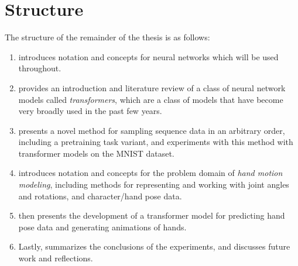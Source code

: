 \section{Structure}

The structure of the remainder of the thesis is as follows:

\begin{enumerate}
    \item {}  introduces notation and concepts for neural networks which will be used throughout.

    \item {} provides an introduction and literature review of a class of neural network models called \textit{transformers}, which are a class of models that have become very broadly used in the past few years.

    \item {} presents a novel method for sampling sequence data in an arbitrary order, including a pretraining task variant, and experiments with this method with transformer models on the MNIST dataset.

    \item {} introduces notation and concepts for the problem domain of \textit{hand motion modeling}, including methods for representing and working with joint angles and rotations, and character/hand pose data.

    \item {} then presents the development of a transformer model for predicting hand pose data and generating animations of hands.

    \item Lastly,  summarizes the conclusions of the experiments, and discusses future work and reflections.
\end{enumerate}
